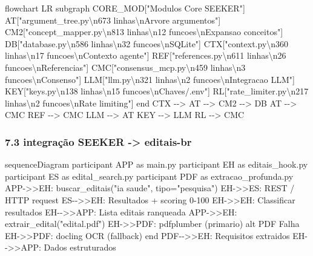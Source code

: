 \documentclass[
  12pt,
]{article}
\newenvironment{Shaded}{}{}
\newcommand{\NormalTok}[1]{#1}
\begin{document}
\begin{Shaded}
\begin{Highlighting}[]
\NormalTok{flowchart LR}
\NormalTok{subgraph CORE\_MOD["Modulos Core SEEKER"]}
\NormalTok{AT["argument\_tree.py\textbackslash{}n673 linhas\textbackslash{}nArvore argumentos"]}
\NormalTok{CM2["concept\_mapper.py\textbackslash{}n813 linhas\textbackslash{}n12 funcoes\textbackslash{}nExpansao conceitos"]}
\NormalTok{DB["database.py\textbackslash{}n586 linhas\textbackslash{}n32 funcoes\textbackslash{}nSQLite"]}
\NormalTok{CTX["context.py\textbackslash{}n360 linhas\textbackslash{}n17 funcoes\textbackslash{}nContexto agente"]}
\NormalTok{REF["references.py\textbackslash{}n611 linhas\textbackslash{}n26 funcoes\textbackslash{}nReferencias"]}
\NormalTok{CMC["consensus\_mcp.py\textbackslash{}n459 linhas\textbackslash{}n3 funcoes\textbackslash{}nConsenso"]}
\NormalTok{LLM["llm.py\textbackslash{}n321 linhas\textbackslash{}n2 funcoes\textbackslash{}nIntegracao LLM"]}
\NormalTok{KEY["keys.py\textbackslash{}n138 linhas\textbackslash{}n15 funcoes\textbackslash{}nChaves/.env"]}
\NormalTok{RL["rate\_limiter.py\textbackslash{}n217 linhas\textbackslash{}n2 funcoes\textbackslash{}nRate limiting"]}
\NormalTok{end}
\NormalTok{CTX {-}{-}\textgreater{} AT {-}{-}\textgreater{} CM2 {-}{-}\textgreater{} DB}
\NormalTok{AT {-}{-}\textgreater{} CMC}
\NormalTok{REF {-}{-}\textgreater{} CMC}
\NormalTok{LLM {-}{-}\textgreater{} AT}
\NormalTok{KEY {-}{-}\textgreater{} LLM}
\NormalTok{RL {-}{-}\textgreater{} CMC}
\end{Highlighting}
\end{Shaded}

\subsubsection{7.3 integração SEEKER -\textgreater{}
editais-br}\label{integrauxe7uxe3o-seeker---editais-br}

\begin{Shaded}
\begin{Highlighting}[]
\NormalTok{sequenceDiagram}
\NormalTok{participant APP as main.py}
\NormalTok{participant EH as editais\_hook.py}
\NormalTok{participant ES as edital\_search.py}
\NormalTok{participant PDF as extracao\_profunda.py}
\NormalTok{APP{-}\textgreater{}\textgreater{}EH: buscar\_editais("ia saude", tipo="pesquisa")}
\NormalTok{EH{-}\textgreater{}\textgreater{}ES: REST / HTTP request}
\NormalTok{ES{-}{-}\textgreater{}\textgreater{}EH: Resultados + scoring 0{-}100}
\NormalTok{EH{-}\textgreater{}\textgreater{}EH: Classificar resultados}
\NormalTok{EH{-}{-}\textgreater{}\textgreater{}APP: Lista editais ranqueada}
\NormalTok{APP{-}\textgreater{}\textgreater{}EH: extrair\_edital("edital.pdf")}
\NormalTok{EH{-}\textgreater{}\textgreater{}PDF: pdfplumber (primario)}
\NormalTok{alt PDF Falha}
\NormalTok{EH{-}\textgreater{}\textgreater{}PDF: docling OCR (fallback)}
\NormalTok{end}
\NormalTok{PDF{-}{-}\textgreater{}\textgreater{}EH: Requisitos extraidos}
\NormalTok{EH{-}{-}\textgreater{}\textgreater{}APP: Dados estruturados}
\end{Highlighting}
\end{Shaded}
\end{document}

